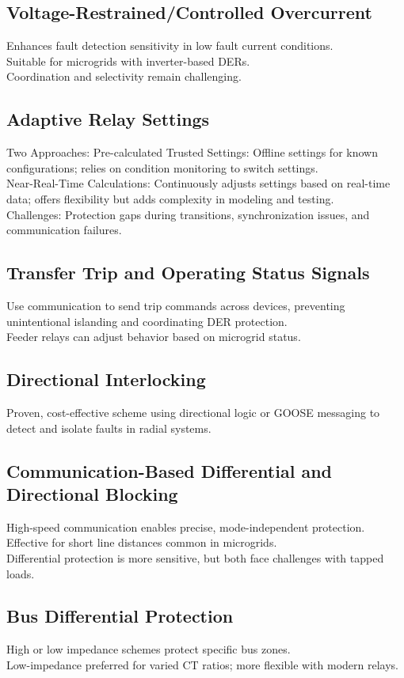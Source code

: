 \subsection{Voltage-Restrained/Controlled Overcurrent}
Enhances fault detection sensitivity in low fault current conditions.\\
Suitable for microgrids with inverter-based DERs.\\
Coordination and selectivity remain challenging.

\subsection{Adaptive Relay Settings}
Two Approaches: Pre-calculated Trusted Settings: Offline settings for known configurations; relies on condition monitoring to switch settings.\\
Near-Real-Time Calculations: Continuously adjusts settings based on real-time data; offers flexibility but adds complexity in modeling and testing.\\
Challenges: Protection gaps during transitions, synchronization issues, and communication failures.
\subsection{Transfer Trip and Operating Status Signals}
Use communication to send trip commands across devices, preventing unintentional islanding and coordinating DER protection.\\
Feeder relays can adjust behavior based on microgrid status.

\subsection{Directional Interlocking}
Proven, cost-effective scheme using directional logic or GOOSE messaging to detect and isolate faults in radial systems.

\subsection{Communication-Based Differential and Directional Blocking}
High-speed communication enables precise, mode-independent protection.\\
Effective for short line distances common in microgrids.\\
Differential protection is more sensitive, but both face challenges with tapped loads.
\subsection{Bus Differential Protection}
High or low impedance schemes protect specific bus zones.\\
Low-impedance preferred for varied CT ratios; more flexible with modern relays.
